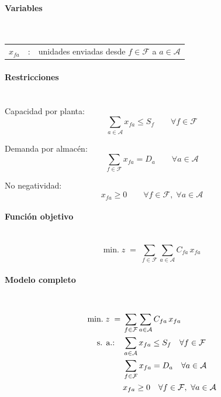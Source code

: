 \paragraph{Variables}\mbox{}\\
\begin{tabular}{l c l}
    $x_{fa}$ & : & unidades enviadas desde $f \in \mathcal{F}$ a $a \in \mathcal{A}$ \\
\end{tabular}

\paragraph{Restricciones}\mbox{}\\
Capacidad por planta:
\begin{equation}
    \sum_{a \in \mathcal{A}} x_{fa} \le S_f \qquad \forall f \in \mathcal{F}
\end{equation}

Demanda por almacén:
\begin{equation}
    \sum_{f \in \mathcal{F}} x_{fa} = D_a \qquad \forall a \in \mathcal{A}
\end{equation}

No negatividad:
\begin{equation}
    x_{fa} \ge 0 \qquad \forall f \in \mathcal{F},\; \forall a \in \mathcal{A}
\end{equation}

\paragraph{Función objetivo}\mbox{}\\
\begin{equation}
\mbox{min.}\; z \;=\; \sum_{f \in \mathcal{F}} \sum_{a \in \mathcal{A}} C_{fa}\,x_{fa}
\end{equation}

\paragraph{Modelo completo}\mbox{}\\
\begin{align}
\mbox{min.}\; z \;=\; & \sum_{f \in \mathcal{F}} \sum_{a \in \mathcal{A}} C_{fa}\,x_{fa} \notag \\
\mbox{s. a.:}\quad
& \sum_{a \in \mathcal{A}} x_{fa} \le S_f \quad \forall f \in \mathcal{F} \notag \\
& \sum_{f \in \mathcal{F}} x_{fa} = D_a \quad \forall a \in \mathcal{A} \notag \\
& x_{fa} \ge 0 \quad \forall f \in \mathcal{F},\ \forall a \in \mathcal{A} \notag
\end{align}
